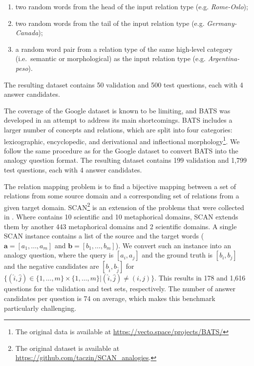 \documentclass[3p]{elsarticle}
\begin{document}
{\begin{description}
\begin{enumerate}
    \item two random words from the head of the input relation type (e.g. \textit{Rome-Oslo}); 
    \item two random words from the tail of the input relation type (e.g. \textit{Germany-Canada}); 
    \item a random word pair from a relation type of the same high-level category (i.e.\ semantic or morphological) as the input relation type (e.g. \textit{Argentina-peso}).
\end{enumerate}
The resulting dataset contains 50 validation and 500 test questions, each with 4 answer candidates.
\item[BATS] The coverage of the Google dataset is known to be limiting, and BATS \cite{gladkova-etal-2016-analogy} was developed in an attempt to address its main shortcomings. BATS includes a larger number of concepts and relations, which are split into four categories: lexicographic, encyclopedic, and derivational and inflectional morphology\footnote{The original data is available at \url{https://vecto.space/projects/BATS/}}. We follow the same procedure as for the Google dataset to convert BATS into the analogy question format. The resulting dataset contains 199 validation and 1,799 test questions, each with 4 answer candidates.
\item[SCAN] The relation mapping problem \cite{turney2008latent} is to find a bijective mapping between a set of relations from some source domain and a corresponding set of relations from a given target domain.
SCAN\footnote{The original dataset is available at \url{https://github.com/taczin/SCAN_analogies}.} \cite{czinczoll2022scientific} is an extension of the problems that were collected in \cite{turney2008latent}. Where \cite{turney2008latent} contains 10 scientific and 10 metaphorical domains, SCAN extends them by another 443 metaphorical domains and 2 scientific domains. A single SCAN instance contains a list of the source and the target words ($\bm{a}=[a_1, \dots, a_m]$ and $\bm{b}=[b_1, \dots, b_m]$). We convert such an instance into an analogy question, where the query is $[a_i, a_j]$ and the ground truth is $[b_i, b_j]$ and the negative candidates are $[b_{\hat{i}}, b_{\hat{j}}]$ for $\{(\hat{i}, \hat{j}) \in \{1,\dots, m\} \times \{1,\dots, m\} | (\hat{i}, \hat{j}) \neq (i, j) \}$. This results in 178 and 1,616 questions for the validation and test sets, respectively. The number of answer candidates per question is 74 on average, which makes this benchmark particularly challenging.

\end{description}}
\end{document}
